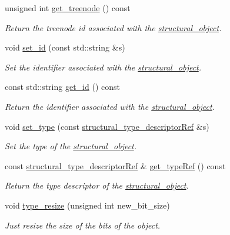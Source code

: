 \begin{DoxyCompactItemize}
unsigned int \hyperlink{classstructural__object_a81b6eec7ac344beeecb51f9f627b9cfe}{get\+\_\+treenode} () const
\begin{DoxyCompactList}\small\item\em Return the treenode id associated with the \hyperlink{classstructural__object}{structural\+\_\+object}. \end{DoxyCompactList}\item 
void \hyperlink{classstructural__object_a9f0eed2702c3b6d4ae0931eee452ec6a}{set\+\_\+id} (const std\+::string \&s)
\begin{DoxyCompactList}\small\item\em Set the identifier associated with the \hyperlink{classstructural__object}{structural\+\_\+object}. \end{DoxyCompactList}\item 
const std\+::string \hyperlink{classstructural__object_a53e1999ebc946f37a981507d4ef72650}{get\+\_\+id} () const
\begin{DoxyCompactList}\small\item\em Return the identifier associated with the \hyperlink{classstructural__object}{structural\+\_\+object}. \end{DoxyCompactList}\item 
void \hyperlink{classstructural__object_a2fb4f8c4b7f0095f12ce03062f851df3}{set\+\_\+type} (const \hyperlink{structural__objects_8hpp_a219296792577e3292783725961506c83}{structural\+\_\+type\+\_\+descriptor\+Ref} \&s)
\begin{DoxyCompactList}\small\item\em Set the type of the \hyperlink{classstructural__object}{structural\+\_\+object}. \end{DoxyCompactList}\item 
const \hyperlink{structural__objects_8hpp_a219296792577e3292783725961506c83}{structural\+\_\+type\+\_\+descriptor\+Ref} \& \hyperlink{classstructural__object_ad2a7fb5dd4d4010876959da82af4f459}{get\+\_\+type\+Ref} () const
\begin{DoxyCompactList}\small\item\em Return the type descriptor of the \hyperlink{classstructural__object}{structural\+\_\+object}. \end{DoxyCompactList}\item 
void \hyperlink{classstructural__object_a9a5e80fe9e81e9ea7e24b05733518e58}{type\+\_\+resize} (unsigned int new\+\_\+bit\+\_\+size)
\begin{DoxyCompactList}\small\item\em Just resize the size of the bits of the object. \end{DoxyCompactList}\item 

\end{DoxyCompactItemize}
